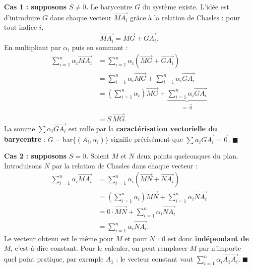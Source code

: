 \documentclass[11pt]{article}
\newcommand{\cle}[1]{{\popxbold\color{popdark}#1}}
\begin{document}
\begin{experience}
\textbf{Cas 1 : supposons $S \neq 0$.} Le barycentre $G$ du système existe. L'idée est d'introduire $G$ dans chaque vecteur $\overrightarrow{MA_i}$ grâce à la \cle{relation de Chasles} : pour tout indice $i$,
\[
\overrightarrow{MA_i} = \overrightarrow{MG} + \overrightarrow{GA_i}.
\]
En multipliant par $\alpha_i$ puis en sommant :
\begin{align*}
\sum_{i=1}^{n} \alpha_i \overrightarrow{MA_i}
&= \sum_{i=1}^{n} \alpha_i \left(\overrightarrow{MG} + \overrightarrow{GA_i}\right) \\
&= \sum_{i=1}^{n} \alpha_i \overrightarrow{MG} + \sum_{i=1}^{n} \alpha_i \overrightarrow{GA_i} \\
&= \left(\sum_{i=1}^{n} \alpha_i\right) \overrightarrow{MG} + \underbrace{\sum_{i=1}^{n} \alpha_i \overrightarrow{GA_i}}_{=\,\vec{0}} \\
&= S \, \overrightarrow{MG}.
\end{align*}
La somme $\sum \alpha_i \overrightarrow{GA_i}$ est nulle par la \textbf{caractérisation vectorielle du barycentre} : $G = \mathrm{bar}\{(A_i, \alpha_i)\}$ signifie précisément que $\sum \alpha_i \overrightarrow{GA_i} = \vec{0}$. $\blacksquare$

\medskip
\textbf{Cas 2 : supposons $S = 0$.} Soient $M$ et $N$ deux points quelconques du plan. Introduisons $N$ par la relation de Chasles dans chaque vecteur :
\begin{align*}
\sum_{i=1}^{n} \alpha_i \overrightarrow{MA_i}
&= \sum_{i=1}^{n} \alpha_i \left(\overrightarrow{MN} + \overrightarrow{NA_i}\right) \\
&= \left(\sum_{i=1}^{n} \alpha_i\right) \overrightarrow{MN} + \sum_{i=1}^{n} \alpha_i \overrightarrow{NA_i} \\
&= 0 \cdot \overrightarrow{MN} + \sum_{i=1}^{n} \alpha_i \overrightarrow{NA_i} \\
&= \sum_{i=1}^{n} \alpha_i \overrightarrow{NA_i}.
\end{align*}
Le vecteur obtenu est le même pour $M$ et pour $N$ : il est donc \textbf{indépendant de $M$}, c'est-à-dire constant. Pour le calculer, on peut remplacer $M$ par n'importe quel point pratique, par exemple $A_1$ : le vecteur constant vaut $\sum_{i=1}^{n} \alpha_i \overrightarrow{A_1 A_i}$. $\blacksquare$
\end{experience}
\end{document}
